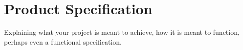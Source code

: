 \chapter{Product Specification}

Explaining what your project is meant to achieve, how it is meant to function, perhaps even a functional specification.